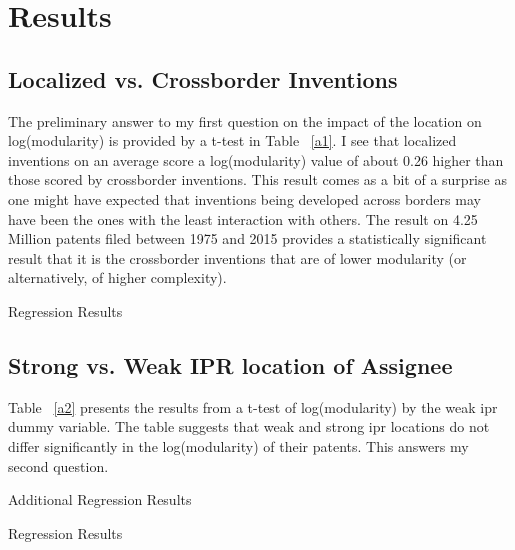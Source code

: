 \documentclass[12pt]{article}
\begin{document}
\section{Results}
\subsection{Localized vs. Crossborder Inventions}
The preliminary answer to my first question on the impact of the location on log(modularity) is provided by a t-test in Table ~\ref{a1}. I see that localized inventions on an average score a log(modularity) value of about 0.26 higher than those scored by crossborder inventions. This result comes as a bit of a surprise as one might have expected that inventions being developed across borders may have been the ones with the least interaction with others. The result on 4.25 Million patents filed between 1975 and 2015 provides a statistically significant result that it is the crossborder inventions that are of lower modularity (or alternatively, of higher complexity).


\begin{landscape}
\begin{table}
\caption{Regression Results}

\end{table}
\end{landscape}

\subsection{Strong vs. Weak IPR location of Assignee}
Table ~\ref{a2} presents the results from a t-test of log(modularity) by the weak ipr dummy variable. The table suggests that weak and strong ipr locations do not differ significantly in the log(modularity) of their patents. This answers my second question.

\begin{landscape}
\begin{table}
\caption{Additional Regression Results}

\end{table}
\end{landscape}

\begin{table}
\caption{Regression Results}

\end{table}
\end{document}
